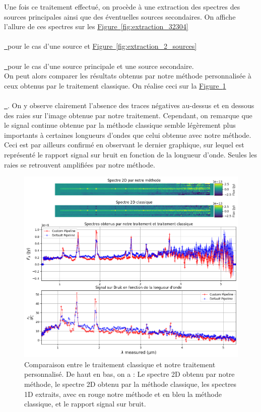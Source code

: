 \documentclass[12pt, a4paper]{article}
\newcommand*{\figref}[2][]{%
  \hyperref[{#2}]{%
    Figure~\ref*{#2}%
    \ifx\\#1\\%
    \else
      \,#1%
    \fi
  }%
}
\begin{document}
Une fois ce traitement effectué, on procède à une extraction des spectres des sources principales ainsi que des éventuelles sources secondaires. On affiche l'allure de ces spectres sur les \figref{fig:extraction_32304} pour le cas d'une source et \figref{fig:extraction_2_sources} pour le cas d'une source principale et une source secondaire.\\

On peut alors comparer les résultats obtenus par notre méthode personnalisée à ceux obtenus par le traitement classique. On réalise ceci sur la \figref{fig:comparaison_mast_custom}. On y observe clairement l'absence des traces négatives au-dessus et en dessous des raies sur l'image obtenue par notre traitement. Cependant, on remarque que le signal continue obtenue par la méthode classique semble légèrement plus importants à certaines longueurs d'ondes que celui obtenue avec notre méthode. Ceci est par ailleurs confirmé en observant le dernier graphique, sur lequel est représenté le rapport signal sur bruit en fonction de la longueur d'onde. Seules les raies se retrouvent amplifiées par notre méthode.\\


\begin{figure}[!h]
  \centering
  \includegraphics[scale=0.5]{assets/comparaison_spectres_mast_custom.png}
  \caption{Comparaison entre le traitement classique et notre traitement personnalisé. De haut en bas, on a : Le spectre 2D obtenu par notre méthode, le spectre 2D obtenu par la méthode classique, les spectres 1D extraits, avec en rouge notre méthode et en bleu la méthode classique, et le rapport signal sur bruit.}
  \label{fig:comparaison_mast_custom}
\end{figure}
\end{document}
